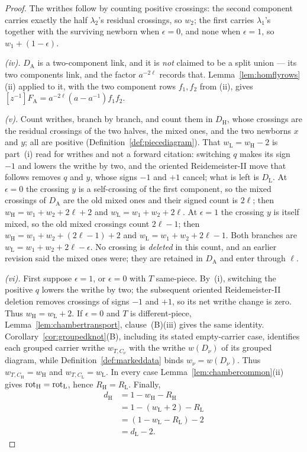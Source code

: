\begin{proof}
The writhes follow by counting positive crossings: the second component carries
exactly the half $\lambda_2$'s residual crossings, so $w_2$; the first carries
$\lambda_1$'s together with the surviving newborn when $\epsilon=0$, and none
when $\epsilon=1$, so $w_1+(1-\epsilon)$.

\emph{(iv).} $D_{\mathrm A}$ is a two-component link, and it is \emph{not}
claimed to be a split union --- its two components link, and the factor
$a^{-2\ell}$ records that. Lemma~\ref{lem:homflyrows}(ii) applied to it, with the two
component rows $f_1,f_2$ from (ii), gives
$[z^{-1}]F_{\mathrm A}=a^{-2\ell}(a-a^{-1})f_1f_2$.

\emph{(v).} Count writhes, branch by branch, and count them in
$D_{\mathrm H}$, whose crossings are the residual crossings of the two halves,
the mixed ones, and the two newborns $x$ and $y$; all are positive
(Definition~\ref{def:piecediagram}). That $w_{\mathrm L}=w_{\mathrm H}-2$ is
part~(i) read for writhes and not a forward citation: switching $q$ makes its
sign $-1$ and lowers the writhe by two, and the oriented Reidemeister-II move
that follows removes $q$ and $y$, whose signs $-1$ and $+1$ cancel; what is
left is $D_{\mathrm L}$. At $\epsilon=0$ the crossing $y$ is a self-crossing
of the first component, so the mixed crossings of $D_{\mathrm A}$ are the old
mixed ones and their signed count is $2\ell$; then
$w_{\mathrm H}=w_1+w_2+2\ell+2$ and $w_{\mathrm L}=w_1+w_2+2\ell$. At
$\epsilon=1$ the crossing $y$ is itself mixed, so the old mixed crossings count
$2\ell-1$; then $w_{\mathrm H}=w_1+w_2+(2\ell-1)+2$ and
$w_{\mathrm L}=w_1+w_2+2\ell-1$. Both branches are
$w_{\mathrm L}=w_1+w_2+2\ell-\epsilon$. No crossing is \emph{deleted} in this
count, and an earlier revision said the mixed ones were; they are retained in
$D_{\mathrm A}$ and enter through $\ell$.


\emph{(vi).} First suppose $\epsilon=1$, or $\epsilon=0$ with $T$ same-piece.
By~(i), switching the positive $q$ lowers the writhe by two; the subsequent
oriented Reidemeister-II deletion removes crossings of signs $-1$ and $+1$,
so its net writhe change is zero. Thus $w_{\mathrm H}=w_{\mathrm L}+2$.
If $\epsilon=0$ and $T$ is different-piece, Lemma~\ref{lem:chambertransport}, clause~(B)(iii)
gives the same identity. Corollary~\ref{cor:groupedknot}(B), including its stated
empty-carrier case, identifies each grouped carrier writhe $w_{T,C_\nu}$ with
the writhe $w(D_\nu)$ of its grouped diagram, while
Definition~\ref{def:markeddata} binds $w_\nu=w(D_\nu)$. Thus
$w_{T,C_{\mathrm H}}=w_{\mathrm H}$ and $w_{T,C_{\mathrm L}}=w_{\mathrm L}$.
In every case Lemma~\ref{lem:chambercommon}(ii) gives $\operatorname{rot}_{\mathrm H}=\operatorname{rot}_{\mathrm L}$, hence $R_{\mathrm H}=R_{\mathrm L}$. Finally,
\begin{align*}
 d_{\mathrm H}&=1-w_{\mathrm H}-R_{\mathrm H}\\
 &=1-(w_{\mathrm L}+2)-R_{\mathrm L}\\
 &=(1-w_{\mathrm L}-R_{\mathrm L})-2\\
 &=d_{\mathrm L}-2.
\end{align*}


\end{proof}

